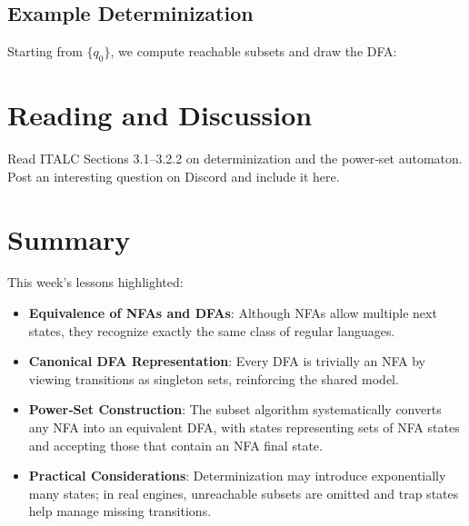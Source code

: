 \documentclass{article}
\begin{document}
\subsection*{Example Determinization}
Starting from $\{q_0\}$, we compute reachable subsets and draw the DFA:
\begin{center}
\end{center}

\section*{Reading and Discussion}
Read ITALC Sections 3.1–3.2.2 on determinization and the power‐set automaton.
Post an interesting question on Discord and include it here.

\section*{Summary}
This week’s lessons highlighted:
\begin{itemize}
  \item \textbf{Equivalence of NFAs and DFAs}: Although NFAs allow multiple
    next states, they recognize exactly the same class of regular languages.
  \item \textbf{Canonical DFA Representation}: Every DFA is trivially an NFA
    by viewing transitions as singleton sets, reinforcing the shared model.
  \item \textbf{Power‐Set Construction}: The subset algorithm systematically
    converts any NFA into an equivalent DFA, with states representing sets
    of NFA states and accepting those that contain an NFA final state.
  \item \textbf{Practical Considerations}: Determinization may introduce
    exponentially many states; in real engines, unreachable subsets are
    omitted and trap states help manage missing transitions.
\end{itemize}
\end{document}

